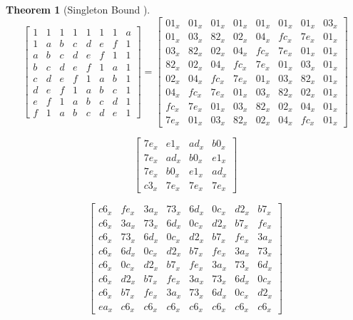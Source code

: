 \documentclass{report}
\newtheorem{theorem}{Theorem}{\bfseries}{\itshape}
\begin{document}
\begin{theorem}[Singleton Bound \cite{SloaneBook}]
\begin{equation}\label{mat:fox-mu8}
\begin{bmatrix}
1 & 1 & 1 & 1 & 1 & 1 & 1 & a\\
1 & a & b & c & d & e & f & 1\\
a & b & c & d & e & f & 1 & 1\\
b & c & d & e & f & 1 & a & 1\\
c & d & e & f & 1 & a & b & 1\\
d & e & f & 1 & a & b & c & 1\\
e & f & 1 & a & b & c & d & 1\\
f & 1 & a & b & c & d & e & 1
\end{bmatrix}
=
\begin{bmatrix}
01_x & 01_x & 01_x & 01_x & 01_x & 01_x & 01_x & 03_x\\
01_x & 03_x & 82_x & 02_x & 04_x & fc_x & 7e_x & 01_x\\
03_x & 82_x & 02_x & 04_x & fc_x & 7e_x & 01_x & 01_x\\
82_x & 02_x & 04_x & fc_x & 7e_x & 01_x & 03_x & 01_x\\
02_x & 04_x & fc_x & 7e_x & 01_x & 03_x & 82_x & 01_x\\
04_x & fc_x & 7e_x & 01_x & 03_x & 82_x & 02_x & 01_x\\
fc_x & 7e_x & 01_x & 03_x & 82_x & 02_x & 04_x & 01_x\\
7e_x & 01_x & 03_x & 82_x & 02_x & 04_x & fc_x & 01_x
\end{bmatrix}
\end{equation}

\begin{equation}\label{mat:fox-mu4-inv}
\begin{bmatrix}
7e_x & e1_x & ad_x & b0_x\\
7e_x & ad_x & b0_x & e1_x\\
7e_x & b0_x & e1_x & ad_x\\
c3_x & 7e_x & 7e_x & 7e_x
\end{bmatrix}
\end{equation}

\begin{equation}\label{mat:fox-mu8-inv}
\begin{bmatrix}
c6_x & fe_x & 3a_x & 73_x & 6d_x & 0c_x & d2_x & b7_x\\
c6_x & 3a_x & 73_x & 6d_x & 0c_x & d2_x & b7_x & fe_x\\
c6_x & 73_x & 6d_x & 0c_x & d2_x & b7_x & fe_x & 3a_x\\
c6_x & 6d_x & 0c_x & d2_x & b7_x & fe_x & 3a_x & 73_x\\
c6_x & 0c_x & d2_x & b7_x & fe_x & 3a_x & 73_x & 6d_x\\
c6_x & d2_x & b7_x & fe_x & 3a_x & 73_x & 6d_x & 0c_x\\
c6_x & b7_x & fe_x & 3a_x & 73_x & 6d_x & 0c_x & d2_x\\
ea_x & c6_x & c6_x & c6_x & c6_x & c6_x & c6_x & c6_x
\end{bmatrix}
\end{equation}


\end{theorem}
\end{document}
